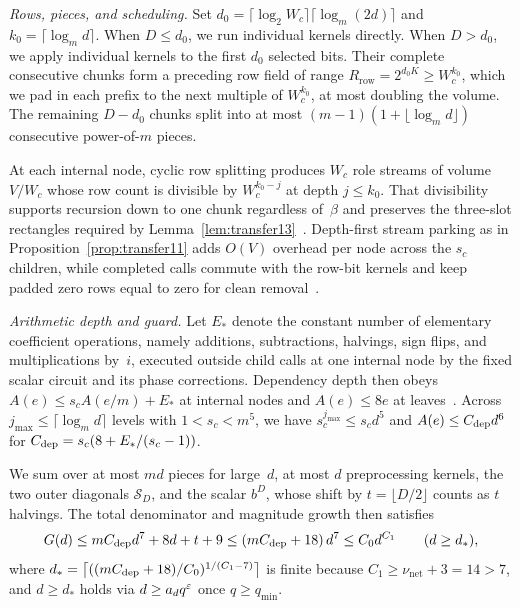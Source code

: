 \emph{Rows, pieces, and scheduling.}
Set $d_0=\lceil\log_2W_c\rceil\lceil\log_m(2d)\rceil$ and $k_0=\lceil\log_md\rceil$. When $D\le d_0$, we run individual kernels directly. When $D>d_0$, we apply individual kernels to the first $d_0$ selected bits. Their complete consecutive chunks form a preceding row field of range $R_{\mathrm{row}}=2^{d_0K}\ge W_c^{k_0}$, which we pad in each prefix to the next multiple of $W_c^{k_0}$, at most doubling the volume. The remaining $D-d_0$ chunks split into at most $(m-1)(1+\lfloor\log_md\rfloor)$ consecutive power-of-$m$ pieces.

At each internal node, cyclic row splitting produces $W_c$ role streams of volume $V/W_c$ whose row count is divisible by $W_c^{k_0-j}$ at depth $j\le k_0$. That divisibility supports recursion down to one chunk regardless of~$\beta$ and preserves the three-slot rectangles required by Lemma~\ref{lem:transfer13}~\cite[\S5.3, pp.~33--34]{OAI26}. Depth-first stream parking as in Proposition~\ref{prop:transfer11} adds $O(V)$ overhead per node across the $s_c$ children, while completed calls commute with the row-bit kernels and keep padded zero rows equal to zero for clean removal~\cite[\S5.3, pp.~33--34]{OAI26}.

\emph{Arithmetic depth and guard.}
Let $E_*$ denote the constant number of elementary coefficient operations, namely additions, subtractions, halvings, sign flips, and multiplications by~$i$, executed outside child calls at one internal node by the fixed scalar circuit and its phase corrections. Dependency depth then obeys $A(e)\le s_cA(e/m)+E_*$ at internal nodes and $A(e)\le8e$ at leaves~\cite[\S5.4, p.~35]{OAI26}. Across $j_{\max}\le\lceil\log_md\rceil$ levels with $1<s_c<m^5$, we have $s_c^{j_{\max}}\le s_cd^5$ and $A(e)\le C_{\rm dep}d^6$ for $C_{\rm dep}=s_c(8+E_*/(s_c-1))$.

We sum over at most $md$ pieces for large~$d$, at most $d$ preprocessing kernels, the two outer diagonals $\mathcal S_D$, and the scalar $b^D$, whose shift by $t=\lfloor D/2\rfloor$ counts as $t$ halvings. The total denominator and magnitude growth then satisfies~\cite[\S5.4, p.~36]{OAI26}
\begin{equation}\label{eq:walsh-guard-growth}
  G(d)\le mC_{\rm dep}d^7+8d+t+9\le(mC_{\rm dep}+18)\,d^7\le C_0d^{C_1}\qquad(d\ge d_*),
\end{equation}
where $d_*=\bigl\lceil((mC_{\rm dep}+18)/C_0)^{1/(C_1-7)}\bigr\rceil$ is finite because $C_1\ge\nu_{\mathrm{net}}+3=14>7$, and $d\ge d_*$ holds via $d\ge a_dq^\varepsilon$ once $q\ge q_{\min}$.

